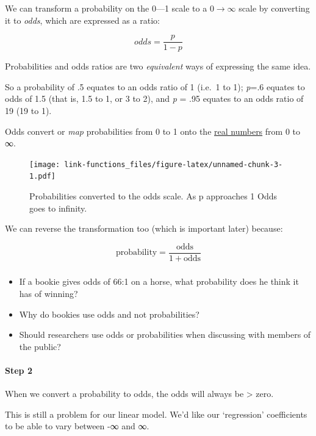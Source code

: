 \documentclass[]{article}
\let\oldparagraph\paragraph
\renewcommand{\paragraph}[1]{\oldparagraph{#1}\mbox{}}
\let\oldsubparagraph\subparagraph
\renewcommand{\subparagraph}[1]{\oldsubparagraph{#1}\mbox{}}
\begin{document}
We can transform a probability on the 0---1 scale to a \(0 \rightarrow ∞\) scale
by converting it to \emph{odds}, which are expressed as a ratio:

\[odds = \dfrac{p}{1-p}\]

Probabilities and odds ratios are two \emph{equivalent} ways of expressing the same
idea.

So a probability of .5 equates to an odds ratio of 1 (i.e.~1 to 1); \emph{p}=.6
equates to odds of 1.5 (that is, 1.5 to 1, or 3 to 2), and \emph{p} = .95 equates to
an odds ratio of 19 (19 to 1).

Odds convert or \emph{map} probabilities from 0 to 1 onto the
\href{http://en.wikipedia.org/wiki/Real_number}{real numbers} from 0 to ∞.

\begin{figure}
\centering
\texttt{[image: link-functions\_files/figure-latex/unnamed-chunk-3-1.pdf]}
\caption{\label{fig:unnamed-chunk-3}Probabilities converted to the odds scale. As p approaches 1 Odds goes to infinity.}
\end{figure}

We can reverse the transformation too (which is important later) because:

\[\textrm{probability} = \dfrac{\textrm{odds}}{1+\textrm{odds}}\]

\hypertarget{section-16}{%
\subparagraph{}\label{section-16}}

\begin{itemize}
\item
  If a bookie gives odds of 66:1 on a horse, what probability does he think it
  has of winning?
\item
  Why do bookies use odds and not probabilities?
\item
  Should researchers use odds or probabilities when discussing with members of
  the public?
\end{itemize}

\hypertarget{step-2}{%
\paragraph{Step 2}\label{step-2}}

When we convert a probability to odds, the odds will always be \textgreater{} zero.

This is still a problem for our linear model. We'd like our `regression'
coefficients to be able to vary between -∞ and ∞.
\end{document}
